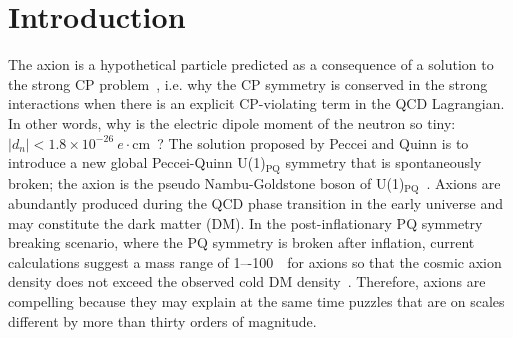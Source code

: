 \section{Introduction} \label{sec:intro}
The axion is a hypothetical particle predicted as a consequence of a  
solution to the strong CP problem~\cite{strongCPI,strongCPII,strongCPIII}, 
i.e. why the CP symmetry is conserved in the strong 
interactions when there is an explicit CP-violating term in the QCD 
Lagrangian. In other words, why is the electric dipole moment 
of the neutron so tiny:  
$\left|d_n\right| < 1.8 \times10^{-26}~e\cdot\mathrm{cm}$~\cite{EDM,PDG}? 
The solution proposed by Peccei and Quinn is to introduce a new global 
Peccei-Quinn U(1)$_\mathrm{PQ}$ symmetry that is spontaneously broken; the 
axion is the pseudo Nambu-Goldstone boson of 
U(1)$_\mathrm{PQ}$~\cite{strongCPI}. 
Axions are abundantly produced during the QCD phase transition in 
the early universe and may constitute the dark matter (DM). 
In the post-inflationary PQ symmetry breaking scenario, where the PQ symmetry
is broken after inflation, current calculations suggest a mass range of 
1–-100~\muevcc\ for axions so that the cosmic axion density does not exceed 
the 
observed cold DM density~\cite{QCDCalI,QCDCalII,QCDCalIII,QCDCalIV,QCDCalV,QCDCalVI,QCDCalVII,QCDCalVIII,QCDCalIX,QCDCalX,QCDCalXI,QCDCalXII,QCDCalXIII}. 
Therefore, axions are compelling because they may explain at the same 
time puzzles that are on scales different by more than thirty orders of 
magnitude. 


%
%
%

%
%
%

